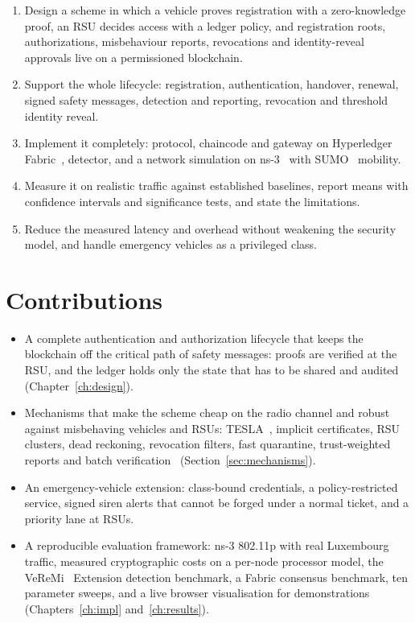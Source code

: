 \begin{enumerate}
  \item Design a scheme in which a vehicle proves registration with a zero-knowledge proof, an RSU
  decides access with a ledger policy, and registration roots, authorizations, misbehaviour reports,
  revocations and identity-reveal approvals live on a permissioned blockchain.
  \item Support the whole lifecycle: registration, authentication, handover, renewal, signed safety
  messages, detection and reporting, revocation and threshold identity reveal.
  \item Implement it completely: protocol, chaincode and gateway on Hyperledger Fabric~\cite{androulaki2018fabric}, detector, and
  a network simulation on ns-3~\cite{riley2010ns3} with SUMO~\cite{lopez2018sumo} mobility.
  \item Measure it on realistic traffic against established baselines, report means with confidence
  intervals and significance tests, and state the limitations.
  \item Reduce the measured latency and overhead without weakening the security model, and handle
  emergency vehicles as a privileged class.
\end{enumerate}

\section{Contributions}

\begin{itemize}
  \item A complete authentication and authorization lifecycle that keeps the blockchain off the
  critical path of safety messages: proofs are verified at the RSU, and the ledger holds only the
  state that has to be shared and audited (Chapter~\ref{ch:design}).
  \item Mechanisms that make the scheme cheap on the radio channel and robust against misbehaving
  vehicles and RSUs: TESLA~\cite{perrig2000tesla}, implicit certificates, RSU clusters, dead reckoning, revocation filters,
  fast quarantine, trust-weighted reports and batch verification~\cite{bellare1998batch} (Section~\ref{sec:mechanisms}).
  \item An emergency-vehicle extension: class-bound credentials, a policy-restricted service,
  signed siren alerts that cannot be forged under a normal ticket, and a priority lane at RSUs.
  \item A reproducible evaluation framework: ns-3 802.11p with real Luxembourg traffic, measured
  cryptographic costs on a per-node processor model, the VeReMi~\cite{kamel2020veremiext} Extension detection benchmark, a
  Fabric consensus benchmark, ten parameter sweeps, and a live browser visualisation for
  demonstrations (Chapters~\ref{ch:impl} and~\ref{ch:results}).
\end{itemize}

